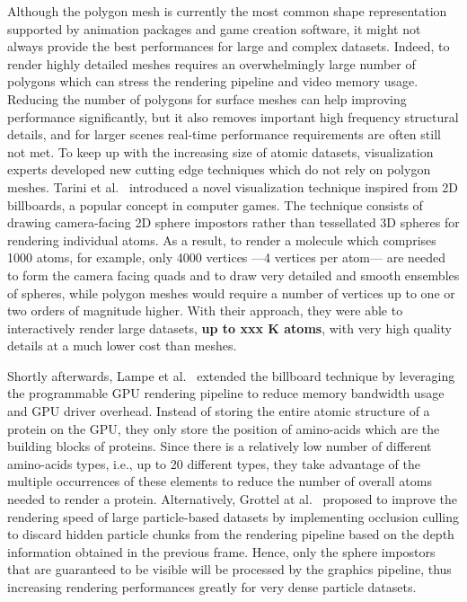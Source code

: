 Although the polygon mesh is currently the most common shape representation supported by animation packages and game creation software, it might not always provide the best performances for large and complex datasets.
Indeed, to render highly detailed meshes requires an overwhelmingly large number of polygons which can stress the rendering pipeline and video memory usage.
Reducing the number of polygons for surface meshes can help improving performance significantly, but it also removes important high frequency structural details, and for larger scenes real-time performance requirements are often still not met.
To keep up with the increasing size of atomic datasets, visualization experts developed new cutting edge techniques which do not rely on polygon meshes.
Tarini et al.~\cite{tarini2006ambient} introduced a novel visualization technique inspired from 2D billboards, a popular concept in computer games.
The technique consists of drawing camera-facing 2D sphere impostors rather than tessellated 3D spheres for rendering individual atoms.
As a result, to render a molecule which comprises 1000 atoms, for example, only 4000 vertices ---4 vertices per atom--- are needed to form the camera facing quads and to draw very detailed and smooth ensembles of spheres, while polygon meshes would require a number of vertices up to one or two orders of magnitude higher.
With their approach, they were able to interactively render large datasets, \textbf{up to xxx K atoms}, with very high quality details at a much lower cost than meshes.

Shortly afterwards, Lampe et al.~\cite{lampe2007two} extended the billboard technique by leveraging the programmable GPU rendering pipeline to reduce memory bandwidth usage and GPU driver overhead. 
Instead of storing the entire atomic structure of a protein on the GPU, they only store the position of amino-acids which are the building blocks of proteins.
Since there is a relatively low number of different amino-acids types, i.e., up to 20 different types, they take advantage of the multiple occurrences of these elements to reduce the number of overall atoms needed to render a protein.
Alternatively, Grottel at al.~\cite{grottel2010coherent} proposed to improve the rendering speed of large particle-based datasets by implementing occlusion culling to discard hidden particle chunks from the rendering pipeline based on the depth information obtained in the previous frame.
Hence, only the sphere impostors that are guaranteed to be visible will be processed by the graphics pipeline, thus increasing rendering performances greatly for very dense particle datasets.

